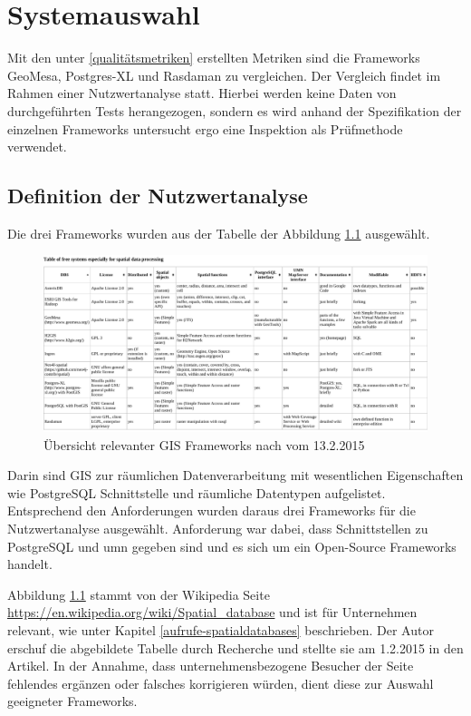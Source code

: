 \chapter{Systemauswahl}
\label{chapter:systemauswahl}
Mit den unter \ref{qualitätsmetriken} erstellten Metriken sind die Frameworks GeoMesa, Postgres-XL und Rasdaman zu vergleichen.
Der Vergleich findet im Rahmen einer Nutzwertanalyse statt.
Hierbei werden keine Daten von durchgeführten Tests herangezogen, sondern es wird anhand der Spezifikation der einzelnen Frameworks untersucht ergo eine Inspektion als Prüfmethode verwendet.

\section{Definition der Nutzwertanalyse}
\label{section:definitionnutzwertanalyse}
Die drei Frameworks wurden aus der Tabelle der Abbildung \ref{fig:spatialdatabases} ausgewählt.
\begin{figure}
\centering
\includegraphics[angle=90,width=.66\textwidth]{Abbildungen/table_spatialdatabases_13_2_15.pdf}
\caption[Übersicht relevanter GIS Frameworks]{Übersicht relevanter GIS Frameworks nach \cite{website:wiki-spatialdatabase} vom 13.2.2015}
\label{fig:spatialdatabases}
\end{figure}
Darin sind GIS zur räumlichen Datenverarbeitung mit wesentlichen Eigenschaften wie \mbox{PostgreSQL} Schnittstelle und räumliche Datentypen aufgelistet.
Entsprechend den Anforderungen wurden daraus drei Frameworks für die Nutzwertanalyse ausgewählt.
Anforderung war dabei, dass Schnittstellen zu PostgreSQL und \Gls{umn} gegeben sind und es sich um ein Open-Source Frameworks handelt.

Abbildung \ref{fig:spatialdatabases} stammt von der Wikipedia Seite \url{https://en.wikipedia.org/wiki/Spatial_database} und ist für Unternehmen relevant, wie unter Kapitel \ref{aufrufe-spatialdatabases} beschrieben.
Der Autor erschuf die abgebildete Tabelle durch Recherche und stellte sie am 1.2.2015 in den Artikel.
In der Annahme, dass unternehmensbezogene Besucher der Seite fehlendes ergänzen oder falsches korrigieren würden, dient diese zur Auswahl geeigneter Frameworks.

